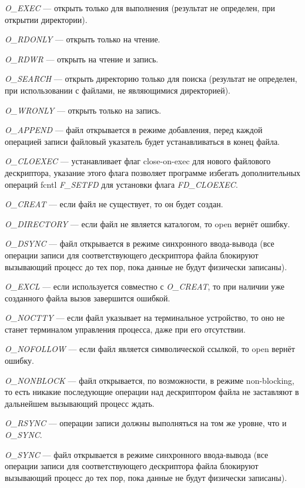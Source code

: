 \textit{O\_EXEC} — открыть только для выполнения (результат не определен, при открытии директории).

\textit{O\_RDONLY} — открыть только на чтение.

\textit{O\_RDWR} — открыть на чтение и запись.

\textit{O\_SEARCH} — открыть директорию только для поиска (результат не определен, при использовании с файлами, не являющимися директорией).

\textit{O\_WRONLY} — открыть только на запись.

\textit{O\_APPEND} — файл открывается в режиме добавления, перед каждой операцией записи файловый указатель будет устанавливаться в конец файла.

\textit{O\_CLOEXEC} — устанавливает флаг close-on-exec для нового файлового дескриптора, указание этого флага позволяет программе избегать дополнительных операций fcntl \textit{F\_SETFD} для установки флага \textit{FD\_CLOEXEC}.

\textit{O\_CREAT} — если файл не существует, то он будет создан.

\textit{O\_DIRECTORY} — если файл не является каталогом, то open вернёт ошибку.

\textit{O\_DSYNC} — файл открывается в режиме синхронного ввода-вывода (все операции записи для соответствующего дескриптора файла блокируют вызывающий процесс до тех пор, пока данные не будут физически записаны).

\textit{O\_EXCL} — если используется совместно с \textit{O\_CREAT}, то при наличии уже созданного файла вызов завершится ошибкой.

\textit{O\_NOCTTY} — если файл указывает на терминальное устройство, то оно не станет терминалом управления процесса, даже при его отсутствии.

\textit{O\_NOFOLLOW} — если файл является символической ссылкой, то open вернёт ошибку.

\textit{O\_NONBLOCK} — файл открывается, по возможности, в режиме non-blocking, то есть никакие последующие операции над дескриптором файла не заставляют в дальнейшем вызывающий процесс ждать.

\textit{O\_RSYNC} — операции записи должны выполняться на том же уровне, что и \textit{O\_SYNC}.

\textit{O\_SYNC} — файл открывается в режиме синхронного ввода-вывода (все операции записи для соответствующего дескриптора файла блокируют вызывающий процесс до тех пор, пока данные не будут физически записаны).

